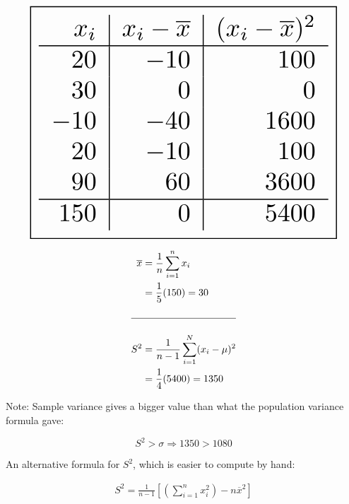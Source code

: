\documentclass[../Notes.tex]{subfiles}
\begin{document}
    \begin{multicols}{3}
        \begin{equation*}
            \begin{gathered}
                \resizebox{0.9\hsize}{!}{\boxed{
                \begin{array}{r | r | r}
                    x_i & x_i - \overline{x} & (x_i - \overline{x})^2   \\
                    \hline      
                    20  & -10 & 100     \\
                    30  & 0   & 0       \\
                    -10 & -40 & 1600    \\
                    20  & -10 & 100     \\
                    90  & 60  & 3600    \\
                    \hline      
                    150 & 0 & 5400       
                \end{array}}}
            \end{gathered}
        \end{equation*}

        \columnbreak

        \begin{align*}
            \overline{x} & = \frac{1}{n}\sum\limits_{i=1}^{n}x_i       \\
                & = \frac{1}{5}(150) = 30                     \\  
                \\
            \hline
            \\
            S^2 & = \frac{1}{n - 1}\sum_{i=1}^{N}(x_i-\mu)^2 \\
                    & = \frac{1}{4}(5400) = 1350
        \end{align*}

        \columnbreak

        Note: Sample variance gives a bigger value than what the population variance formula gave:
        
        \begin{equation*}
            S^2 > \sigma \Rightarrow 1350 > 1080
        \end{equation*}
    \end{multicols}

    An alternative formula for $S^2$, which is easier to compute by hand:

    \begin{align*}
        S^2 = \frac{1}{n-1}\left[\left(\sum_{i=1}^{n}x^{2}_{i}\right)-n\overline{x}^2\right]
    \end{align*}
\end{document}
